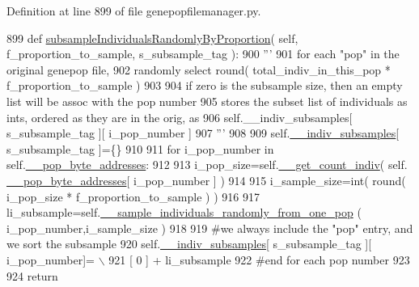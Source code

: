 Definition at line 899 of file genepopfilemanager.\+py.


\begin{DoxyCode}
899     \textcolor{keyword}{def }\hyperlink{classnegui_1_1genepopfilemanager_1_1GenepopFileManager_a5c85ac4838fd6919be1c408bcd39f54e}{subsampleIndividualsRandomlyByProportion}( self, 
      f\_proportion\_to\_sample, s\_subsample\_tag ):
900         \textcolor{stringliteral}{'''}
901 \textcolor{stringliteral}{        for each "pop" in the original genepop file,}
902 \textcolor{stringliteral}{        randomly select round( total\_indiv\_in\_this\_pop * f\_proportion\_to\_sample )}
903 \textcolor{stringliteral}{        }
904 \textcolor{stringliteral}{        if zero is the subsample size, then an empty list will be assoc with the pop number}
905 \textcolor{stringliteral}{        stores the subset list of individuals as ints, ordered as they are in the orig, as      }
906 \textcolor{stringliteral}{        self.\_\_indiv\_subsamples[ s\_subsample\_tag ][ i\_pop\_number ]}
907 \textcolor{stringliteral}{        '''}
908 
909         self.\hyperlink{classnegui_1_1genepopfilemanager_1_1GenepopFileManager_a1e8379bcee4902ca9314ff53fcb71644}{\_\_indiv\_subsamples}[ s\_subsample\_tag ]=\{\}
910 
911         \textcolor{keywordflow}{for} i\_pop\_number \textcolor{keywordflow}{in} self.\hyperlink{classnegui_1_1genepopfilemanager_1_1GenepopFileManager_ae24c2bdd19136a345bdb42fd49c5d91f}{\_\_pop\_byte\_addresses}:
912 
913             i\_pop\_size=self.\hyperlink{classnegui_1_1genepopfilemanager_1_1GenepopFileManager_ac7cc98fe56efee82b4ffd4dc816a4704}{\_\_get\_count\_indiv}( self.
      \hyperlink{classnegui_1_1genepopfilemanager_1_1GenepopFileManager_ae24c2bdd19136a345bdb42fd49c5d91f}{\_\_pop\_byte\_addresses}[ i\_pop\_number ] )
914 
915             i\_sample\_size=int( round( i\_pop\_size * f\_proportion\_to\_sample ) )
916 
917             li\_subsample=self.\hyperlink{classnegui_1_1genepopfilemanager_1_1GenepopFileManager_a9818467c9cb40f8e1de0c6cc7f52e263}{\_\_sample\_individuals\_randomly\_from\_one\_pop}
      ( i\_pop\_number,i\_sample\_size )
918 
919             \textcolor{comment}{#we always include the "pop" entry, and we sort the subsample}
920             self.\hyperlink{classnegui_1_1genepopfilemanager_1_1GenepopFileManager_a1e8379bcee4902ca9314ff53fcb71644}{\_\_indiv\_subsamples}[ s\_subsample\_tag ][ i\_pop\_number]= \(\backslash\)
921                      [ 0 ] +  li\_subsample
922         \textcolor{comment}{#end for each pop number}
923 
924         \textcolor{keywordflow}{return}
\end{DoxyCode}
